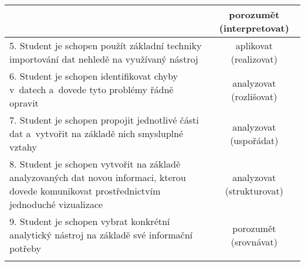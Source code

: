 \begin{table}[htbp]
{\begin{tabularx}{\linewidth}{p{9cm}c}
&

porozumět (interpretovat)

\\

\midrule

5. Student je schopen použít základní techniky importování dat nehledě na využívaný nástroj\label{5-cil}

&

aplikovat (realizovat)

\\

\midrule

6. Student je schopen identifikovat chyby v~datech a~dovede tyto problémy řádně opravit\label{6-cil}

&

analyzovat (rozlišovat)

\\

\midrule

7. Student je schopen propojit jednotlivé části dat a~vytvořit na základě nich smysluplné vztahy\label{7-cil}

&

analyzovat (uspořádat)

\\

\midrule

8. Student je schopen vytvořit na základě analyzovaných dat novou informaci, kterou dovede komunikovat prostřednictvím jednoduché vizualizace\label{8-cil}

&

analyzovat (strukturovat)

\\

\midrule

9. Student je schopen vybrat konkrétní analytický nástroj na základě své informační potřeby\label{9-cil}

&

porozumět (srovnávat)

\\

\tabularnewline
\bottomrule
\end{tabularx}

}

\end{table}
